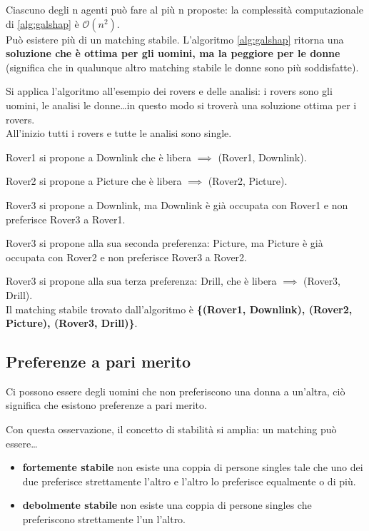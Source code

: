 Ciascuno degli n agenti può fare al più n proposte: la complessità
computazionale di \ref{alg:galshap} è $\mathcal{O}(n^2)$.\\

Può esistere più di un matching stabile. L'algoritmo \ref{alg:galshap}
ritorna una \textbf{soluzione che è ottima per gli uomini, ma la peggiore per
le donne} (significa che in qualunque altro matching stabile le donne sono
più soddisfatte).

Si applica l'algoritmo all'esempio dei rovers e delle analisi: i
rovers sono gli uomini, le analisi le donne\dots in questo modo si troverà
una soluzione ottima per i rovers.\\

All'inizio tutti i rovers e tutte le analisi sono single.

Rover1 si propone a Downlink che è libera $\implies$ (Rover1, Downlink).

Rover2 si propone a Picture che è libera $\implies$ (Rover2, Picture).

Rover3 si propone a Downlink, ma Downlink è già occupata con Rover1 e non
preferisce Rover3 a Rover1.

Rover3 si propone alla sua seconda preferenza: Picture, ma Picture è già
occupata con Rover2 e non preferisce Rover3 a Rover2.

Rover3 si propone alla sua terza preferenza: Drill, che è libera $\implies$
(Rover3, Drill).\\

Il matching stabile trovato dall'algoritmo è \textbf{\{(Rover1, Downlink),
(Rover2, Picture), (Rover3, Drill)\}}.

\subsection{Preferenze a pari merito}

Ci possono essere degli uomini che non preferiscono una donna a un'altra,
ciò significa che esistono preferenze a pari merito.

Con questa osservazione, il concetto di stabilità si amplia: un matching
può essere\dots

\begin{itemize}
 \item \textbf{fortemente stabile} non esiste una coppia di persone singles
tale che uno dei due preferisce strettamente l'altro e l'altro lo preferisce
equalmente o di più.
 \item \textbf{debolmente stabile} non esiste una coppia di persone singles
che preferiscono strettamente l'un l'altro.
\end{itemize}


